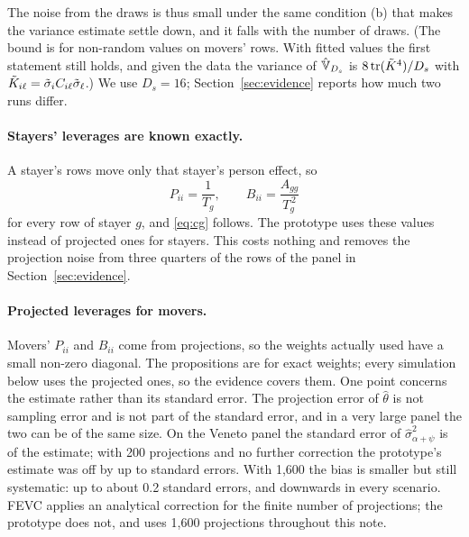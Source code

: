 The noise from the draws is thus small under the same condition (b) that makes the variance estimate settle
down, and it falls with the number of draws. (The bound is for non-random values on movers' rows. With fitted
values the first statement still holds, and given the data the variance of $\hat{\mathbb{V}}_{D_s}$ is
$8\operatorname{tr}(\tilde K^4)/D_s$ with $\tilde K_{i\ell}=\tilde\sigma_iC_{i\ell}\tilde\sigma_\ell$.) We use $D_s=16$; Section~\ref{sec:evidence} reports how much two
runs differ.

\paragraph{Stayers' leverages are known exactly.} A stayer's rows move only that stayer's person effect, so
\[
P_{ii}=\frac{1}{T_g},\qquad B_{ii}=\frac{A_{gg}}{T_g^{\,2}}
\]
for every row of stayer $g$, and \eqref{eq:cg} follows. The prototype uses these values instead of projected
ones for stayers. This costs nothing and removes the projection noise from three quarters of the rows of the
panel in Section~\ref{sec:evidence}.

\paragraph{Projected leverages for movers.} Movers' $P_{ii}$ and $B_{ii}$ come from projections, so the weights
actually used have a small non-zero diagonal. The propositions are for exact weights; every simulation below
uses the projected ones, so the evidence covers them. One point concerns the estimate rather than its standard
error. The projection error of $\hat\theta$ is not sampling error and is not part of the standard error, and in a
very large panel the two can be of the same size. On the Veneto panel the standard error of
$\hat\sigma^2_{\alpha+\psi}$ is  of the estimate; with 200 projections and no further
correction the prototype's estimate was off by up to  standard errors. With 1{,}600 the bias is
smaller but still systematic: up to about 0.2 standard errors, and downwards in every scenario. FEVC applies an analytical correction for the finite number of projections; the prototype
does not, and uses 1{,}600 projections throughout this note.

